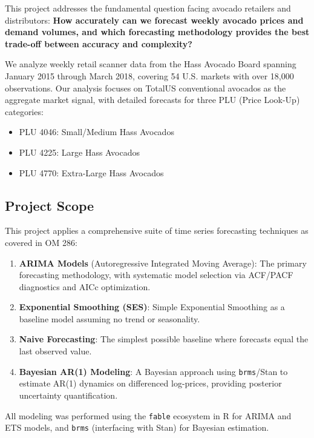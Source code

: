 \documentclass[12pt]{article}
\begin{document}
This project addresses the fundamental question facing avocado retailers and distributors: \textbf{How accurately can we forecast weekly avocado prices and demand volumes, and which forecasting methodology provides the best trade-off between accuracy and complexity?}

We analyze weekly retail scanner data from the Hass Avocado Board spanning January 2015 through March 2018, covering 54 U.S. markets with over 18,000 observations. Our analysis focuses on TotalUS conventional avocados as the aggregate market signal, with detailed forecasts for three PLU (Price Look-Up) categories:
\begin{itemize}
    \item PLU 4046: Small/Medium Hass Avocados
    \item PLU 4225: Large Hass Avocados
    \item PLU 4770: Extra-Large Hass Avocados
\end{itemize}

\subsection{Project Scope}

This project applies a comprehensive suite of time series forecasting techniques as covered in OM 286:

\begin{enumerate}
    \item \textbf{ARIMA Models} (Autoregressive Integrated Moving Average): The primary forecasting methodology, with systematic model selection via ACF/PACF diagnostics and AICc optimization.
    
    \item \textbf{Exponential Smoothing (SES)}: Simple Exponential Smoothing as a baseline model assuming no trend or seasonality.
    
    \item \textbf{Naive Forecasting}: The simplest possible baseline where forecasts equal the last observed value.
    
    \item \textbf{Bayesian AR(1) Modeling}: A Bayesian approach using \texttt{brms}/Stan to estimate AR(1) dynamics on differenced log-prices, providing posterior uncertainty quantification.
\end{enumerate}

All modeling was performed using the \texttt{fable} ecosystem in R for ARIMA and ETS models, and \texttt{brms} (interfacing with Stan) for Bayesian estimation.
\end{document}
